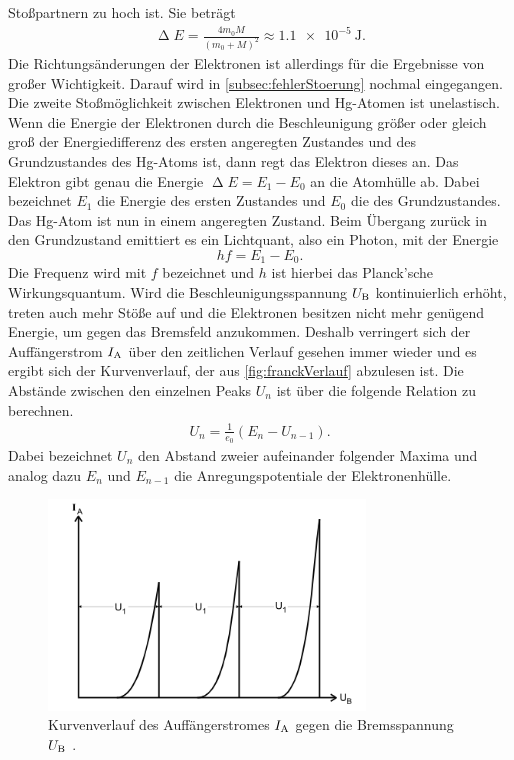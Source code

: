 Stoßpartnern zu hoch ist. Sie beträgt
\begin{align}
    \upDelta E = \frac{4 m_0 M}{(m_0 + M)^2} \approx \SI{1,1 e-5}{\joule}.%
\end{align}
Die Richtungsänderungen der Elektronen ist allerdings für die Ergebnisse von großer Wichtigkeit. Darauf wird in \autoref{subsec:fehlerStoerung} nochmal eingegangen.
Die zweite Stoßmöglichkeit zwischen Elektronen und Hg-Atomen ist unelastisch. Wenn die Energie der Elektronen durch die Beschleunigung größer oder gleich groß der Energiedifferenz des ersten angeregten Zustandes und des Grundzustandes des Hg-Atoms ist, dann regt das Elektron dieses an.
Das Elektron gibt genau die Energie $\upDelta E = E_1 - E_0$ an die Atomhülle ab. Dabei bezeichnet $E_1$ die Energie des ersten Zustandes und $E_0$ die des Grundzustandes.
Das Hg-Atom ist nun in einem angeregten Zustand. Beim Übergang zurück in den Grundzustand emittiert es ein Lichtquant, also ein Photon, mit der Energie
\begin{equation}
    hf = E_1 - E_0.
    \label{eqn:hfu}
\end{equation}
Die Frequenz wird mit $f$ bezeichnet und $h$ ist hierbei das Planck'sche Wirkungsquantum.
Wird die Beschleunigungsspannung $U_{\text B}$ kontinuierlich erhöht, treten auch mehr Stöße auf und die Elektronen besitzen nicht mehr genügend Energie, um gegen das Bremsfeld anzukommen.
Deshalb verringert sich der Auffängerstrom $I_{\text A}$ über den zeitlichen Verlauf gesehen immer wieder und es ergibt sich der Kurvenverlauf, der aus \autoref{fig:franckVerlauf} abzulesen ist.
Die Abstände zwischen den einzelnen Peaks $U_n$ ist über die folgende Relation zu berechnen.
\begin{align}
    U_n = \frac{1}{e_0} (E_n - U_{n-1}).
    \label{eqn:abstMaxima}
\end{align}
Dabei bezeichnet $U_n$ den Abstand zweier aufeinander folgender Maxima und analog dazu $E_n$ und $E_{n-1}$ die Anregungspotentiale der Elektronenhülle.

\begin{figure}[H]
    \centering
    \includegraphics[width=0.75\textwidth]{data/VerlaufFH.png}
    \caption{Kurvenverlauf des Auffängerstromes $I_{\text A}$ gegen die Bremsspannung $U_{\text B}$ \cite{Anleitung601}.}
    \label{fig:franckVerlauf}
\end{figure}

